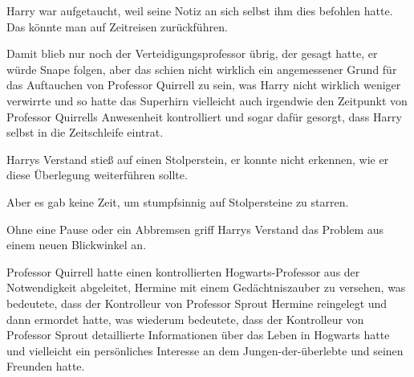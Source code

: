 Harry war aufgetaucht, weil seine Notiz an sich selbst ihm dies befohlen hatte. Das könnte man auf Zeitreisen zurückführen.

Damit blieb nur noch der Verteidigungsprofessor übrig, der gesagt hatte, er würde Snape folgen, aber das schien nicht wirklich ein angemessener Grund für das Auftauchen von Professor Quirrell zu sein, was Harry nicht wirklich weniger verwirrte und so hatte das Superhirn vielleicht auch irgendwie den Zeitpunkt von Professor Quirrells Anwesenheit kontrolliert und sogar dafür gesorgt, dass Harry selbst in die Zeitschleife eintrat.

Harrys Verstand stieß auf einen Stolperstein, er konnte nicht erkennen, wie er diese Überlegung weiterführen sollte.

Aber es gab keine Zeit, um stumpfsinnig auf Stolpersteine zu starren.

Ohne eine Pause oder ein Abbremsen griff Harrys Verstand das Problem aus einem neuen Blickwinkel an.

Professor Quirrell hatte einen kontrollierten Hogwarts-Professor aus der Notwendigkeit abgeleitet, Hermine mit einem Gedächtniszauber zu versehen, was bedeutete, dass der Kontrolleur von Professor Sprout Hermine reingelegt und dann ermordet hatte, was wiederum bedeutete, dass der Kontrolleur von Professor Sprout detaillierte Informationen über das Leben in Hogwarts hatte und vielleicht ein persönliches Interesse an dem Jungen-der-überlebte und seinen Freunden hatte.

